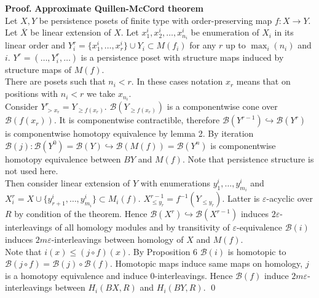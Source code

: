 \documentclass[a4paper, 12pt]{article}
\theoremstyle{definition}
\theoremstyle{remark}
\newenvironment{pf}{\noindent\textbf{Proof.}}{\qed}
\renewcommand{\leq}{\leqslant}
\renewcommand{\geq}{\geqslant}
\begin{document}
\begin{pf} \textbf{Approximate Quillen-McCord theorem}\\
  Let $X, Y$ be persistence posets of finite type with order-preserving map $f : X \to Y$.\\

  Let $\overline{X}$ be linear extension of $X$. Let $x^i_1, x^i_2, \ldots, x^i_{n_i}$ be enumeration of $X_i$ in its linear order and $Y_i^r = \{x^i_1,\ldots,x^i_r\} \cup Y_i \subset M(f_i)$ for any $r$ up to $\max_{i}(n_i)$ and $i$. $Y^r = (\ldots, Y_i^r, \ldots)$ is a persistence poset with structure maps induced by structure maps of $M(f)$.\\

  There are posets such that $n_i < r$. In these cases notation $x_r$ means that on positions with $n_i < r$ we take $x_{n_i}$.\\

  Consider $Y^r_{>x_r} = Y_{\geq f(x_r)}$. $\mathcal{B}(Y_{\geq f(x_r)})$ is a componentwise cone over $\mathcal{B}(f(x_r))$. It is componentwise contractible, therefore $\mathcal{B}(Y^{r-1}) \hookrightarrow \mathcal{B}(Y^{r})$ is componentwise homotopy equivalence by lemma 2. By iteration $\mathcal{B}(j) : \mathcal{B}(Y^{0}) = \mathcal{B}(Y) \hookrightarrow \mathcal{B}(M(f)) = \mathcal{B}(Y^n)$ is componentwise homotopy equivalence between $BY$ and $M(f)$. Note that persistence structure is not used here.\\

  Then consider linear extension of $Y$ with enumerations $y^i_1,\ldots,y^i_{m_i}$ and $X_i^r = X \cup \{y^i_{r+1},\ldots,y^i_{m_i}\} \subset M_i(f)$. $X^{r-1}_{\leq y_r} = f^{-1}(Y_{\leqslant y_r})$. Latter is $\varepsilon$-acyclic over $R$ by condition of the theorem. Hence $\mathcal{B}(X^{r}) \hookrightarrow \mathcal{B}(X^{r-1})$ induces $2\varepsilon$-interleavings of all homology modules and by transitivity of $\varepsilon$-equivalence $\mathcal{B}(i)$ induces $2m\varepsilon$-interleavings between homology of $X$ and $M(f)$.\\

  Note that $i(x) \leqslant (j \circ f)(x)$. By Proposition 6 $\mathcal{B}(i)$ is homotopic to $\mathcal{B}(j \circ f) = \mathcal{B}(j) \circ \mathcal{B}(f)$. Homotopic maps induce same maps on homology, $j$ is a homotopy equivalence and induce $0$-interleavings. Hence $\mathcal{B}(f)$ induce $2m\varepsilon$-interleavings between $H_i(BX,R)$ and $H_i(BY,R)$.
\end{pf}
\end{document}

